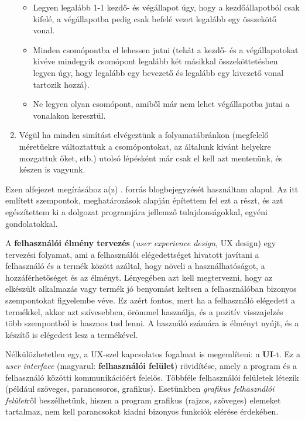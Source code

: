 \begin{enumerate}
\begin{itemize}
\item Legyen legalább 1-1 kezdő- és végállapot úgy, hogy a kezdőállapotból csak kifelé, a végállapotba pedig csak befelé vezet legalább egy összekötő vonal.
\item Minden csomópontba el lehessen jutni (tehát a kezdő- és a végállapotokat kivéve mindegyik csomópont legalább két másikkal összeköttetésben legyen úgy, hogy legalább egy bevezető és legalább egy kivezető vonal tartozik hozzá).
\item Ne legyen olyan csomópont, amiből már nem lehet végállapotba jutni a vonalakon keresztül.
\end{itemize}

\item Végül ha minden simítást elvégeztünk a folyamatábránkon (megfelelő méretűekre változtattuk a csomópontokat, az általunk kívánt helyekre mozgattuk őket, stb.) utolsó lépésként már csak el kell azt mentenünk, és készen is vagyunk.
\end{enumerate}


Ezen alfejezet megírásához a(z) \cite{uxblog}. forrás blogbejegyzését használtam alapul. Az itt említett szempontok, meghatározások alapján építettem fel ezt a részt, és azt egészítettem ki a dolgozat programjára jellemző tulajdonságokkal, egyéni gondolatokkal.


A \textbf{felhasználói élmény tervezés} (\textit{user experience design}, UX design) egy tervezési folyamat, ami a felhasználói elégedettséget hivatott javítani a felhasználó és a termék között azáltal, hogy növeli a használhatóságot, a hozzáférhetőséget és az élményt. Lényegében azt kell megtervezni, hogy az elkészült alkalmazás vagy termék jó benyomást keltsen a felhasználóban bizonyos szempontokat figyelembe véve. Ez azért fontos, mert ha a felhasználó elégedett a termékkel, akkor azt szívesebben, örömmel használja, és a pozitív visszajelzés több szempontból is hasznos tud lenni. A használó számára is élményt nyújt, és a készítő is elégedett lesz a termékével.

Nélkülözhetetlen egy, a UX-szel kapcsolatos fogalmat is megemlíteni: a \textbf{UI}-t. Ez a \textit{user interface} (magyarul: \textbf{felhasználói felület}) rövidítése, amely a program és a felhasználó közötti kommunikációért felelős. Többféle felhasználói felületek létezik (például szöveges, parancssoros, grafikus). Esetünkben \textit{grafikus felhasználói felület}ről beszélhetünk, hiszen a program grafikus (rajzos, szöveges) elemeket tartalmaz, nem kell parancsokat kiadni bizonyos funkciók elérése érdekében.

